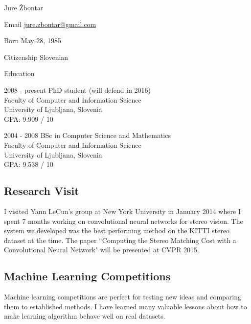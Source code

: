 \documentclass[12pt,a4paper]{article}
\begin{document}
\begin{cv}{Jure \v{Z}bontar}

\begin{cvlist}{}
\item[Email] \href{mailto:jure.zbontar@gmail.com}{jure.zbontar@gmail.com}

\item[Born] May 28, 1985
\item[Citizenship] Slovenian

\end{cvlist}

\begin{cvlist}{Education}
\item[2008 - present] PhD student (will defend in 2016) \\
Faculty of Computer and Information Science \\
University of Ljubljana, Slovenia \\
GPA: 9.909 / 10

\item[2004 - 2008] BSc in Computer Science and Mathematics \\
Faculty of Computer and Information Science \\
University of Ljubljana, Slovenia \\
GPA: 9.538 / 10

\end{cvlist}

\subsection*{Research Visit}
I visited Yann LeCun's group at New York University in January 2014
where I spent 7 months working on convolutional neural networks for
stereo vision. The system we developed was the best performing method on
the KITTI stereo dataset at the time. The paper ``Computing the Stereo
Matching Cost with a Convolutional Neural Network" will be presented at
CVPR 2015.

\subsection*{Machine Learning Competitions}
Machine learning competitions are perfect for testing new ideas and
comparing them to established methods. I have learned many valuable
lessons about how to make learning algorithm behave well on real datasets.


\end{cv}
\end{document}
